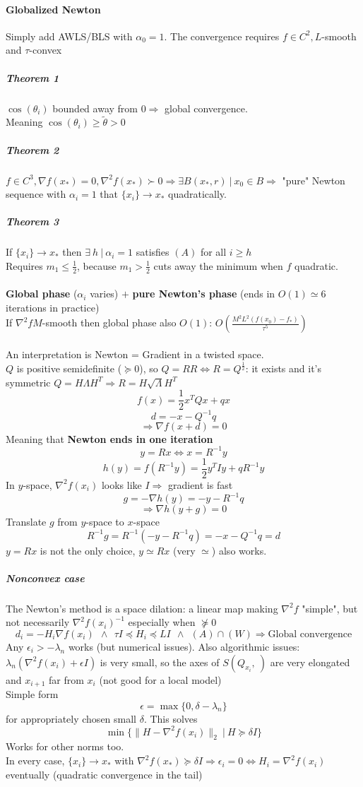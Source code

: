 \documentclass[10pt]{report}
\begin{document}
\paragraph{Globalized Newton} Simply add AWLS/BLS with $\alpha_0 = 1$. The convergence requires $f\in C^2, L$-smooth and $\tau$-convex
\subparagraph{Theorem 1} $\cos(\theta_i)$ bounded away from $0 \Rightarrow$ global convergence.\\
Meaning $\cos(\theta_i)\geq \tilde{\theta} > 0$
\subparagraph{Theorem 2} $f\in C^3, \nabla f(x_*) = 0, \nabla^2 f(x_*)\succ 0\Rightarrow\exists B(x_*, r)\:|\:x_0\in B\Rightarrow$ "pure" Newton sequence with $\alpha_i = 1$ that $\{x_i\}\rightarrow x_*$ quadratically.
\subparagraph{Theorem 3} If $\{x_i\}\rightarrow x_*$ then $\exists\:h\:|\:\alpha_i = 1$ satisfies $(A)$ for all $i\geq h$\\
Requires $m_1\leq \frac{1}{2}$, because $m_1>\frac{1}{2}$ cuts away the minimum when $f$ quadratic.\\\\
\textbf{Global phase} ($\alpha_i$ varies) $+$ \textbf{pure Newton's phase} (ends in $O(1)\simeq 6$ iterations in practice)\\
If $\nabla^2 f M$-smooth then global phase also $O(1)$: $O\left(\displaystyle \frac{M^2L^2(f(x_0)-f_*)}{\displaystyle \tau^5}\right)$\\\\
An interpretation is Newton = Gradient in a twisted space.\\
$Q$ is positive semidefinite ($\succeq 0$), so $Q= RR\Leftrightarrow R = Q^{\frac{1}{2}}$: it exists and it's symmetric $Q=H\Lambda H^T\Rightarrow R = H\sqrt{\Lambda}H^T$
$$f(x) = \frac{1}{2}x^TQx + qx$$ $$d = -x-Q^{-1}q$$ $$\Rightarrow \nabla f(x+d)=0$$ Meaning that \textbf{Newton ends in one iteration} $$y = Rx \Leftrightarrow x = R^{-1}y$$ $$h(y) = f(R^{-1}y) = \frac{1}{2}y^TIy + qR^{-1}y$$ In $y$-space, $\nabla^2 f(x_i)$ looks like $I\Rightarrow$ gradient is fast $$g = -\nabla h(y) = -y-R^{-1}q$$ $$\Rightarrow \nabla h(y+g) = 0$$
Translate $g$ from $y$-space to $x$-space
$$R^{-1}g=R^{-1}(-y-R^{-1}q) = -x-Q^{-1}q = d$$
$y = Rx$ is not the only choice, $y\simeq Rx$ (very $\simeq$) also works.
\subparagraph{Nonconvex case} The Newton's method is a space dilation: a linear map making $\nabla^2 f$ "simple", but not necessarily $\nabla^2f(x_i)^{-1}$ especially when $\not\succeq 0$
$$d_i=-H_{i}\nabla f(x_i)\:\:\land\:\: \tau I\preceq H_i\preceq LI\:\:\land\:\: (A)\cap (W)\Rightarrow\text{Global convergence}$$
Any $\epsilon_i > -\lambda_n$ works (but numerical issues). Also algorithmic issues: $\lambda_n(\nabla^2 f(x_i)+\epsilon I)$ is very small, so the axes of $S(Q_{x_i},\:)$ are very elongated and $x_{i+1}$ far from $x_i$ (not good for a local model)\\
Simple form $$\epsilon = \max\{0,\delta - \lambda_n\}$$ for appropriately chosen small $\delta$. This solves $$\min\{\|H-\nabla^2 f(x_i)\|_2\:|\:H\succeq \delta I\}$$ Works for other norms too.\\
In every case, $\{x_i\}\rightarrow x_*$ with $\nabla^2 f(x_*)\succeq \delta I\Rightarrow \epsilon_i = 0 \Leftrightarrow H_i = \nabla^2 f(x_i)$ eventually (quadratic convergence in the tail)
\end{document}
